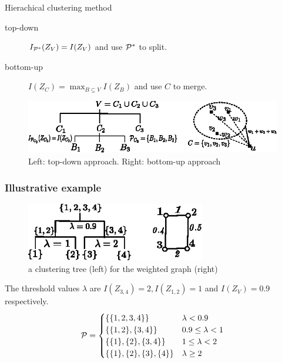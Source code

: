 \documentclass{beamer}
\begin{document}
\begin{frame}{Hierachical clustering method}

\begin{description}
\item[top-down] $I_{\P^*}(Z_V)=I(Z_V)$ and use $\P^*$ to split.
\item[bottom-up] $I(Z_C) = \max_{B\subseteq V} I(Z_B)$ and use $C$ to merge.
\end{description}
\begin{figure}
\centering
\includegraphics[width=\textwidth]{paper/pic/two_approach.eps}
\caption{Left: top-down approach. Right: bottom-up approach}
\end{figure}
\end{frame}
\begin{frame}
\frametitle{Illustrative example}
\begin{figure}
\centering
\includegraphics[width=0.7\textwidth]{paper/pic/threshold.eps}
\caption{a clustering tree (left) for the weighted graph (right)}
\end{figure}

The threshold values $\lambda$ are $I(Z_{3,4})=2, I(Z_{1,2})=1$ and $I(Z_V)=0.9$ respectively.
\begin{equation*}
\P = 
\begin{cases}
\{\{1,2,3,4\}\} & \lambda < 0.9 \\
\{\{1,2\},\{3,4\}\} & 0.9 \leq \lambda < 1 \\
\{\{1\},\{2\},\{3,4\}\} & 1 \leq \lambda < 2\\
\{\{1\},\{2\},\{3\},\{4\}\} & \lambda \geq 2
\end{cases}
\end{equation*}
\end{frame}
\end{document}
